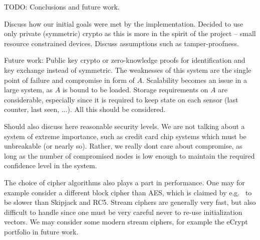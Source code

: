 TODO: Conclusions and future work.

Discuss how our initial goals were met by the implementation. Decided to use only private (symmetric) crypto as this is more in the spirit of the project -- small resource constrained devices. Discuss assumptions such as tamper-proofness.

Future work: Public key crypto or zero-knowledge proofs for identification and key exchange instead of symmetric. The weaknesses of this system are the single point of failure and compromise in form of $A$. Scalability becomes an issue in a large system, as $A$ is bound to be loaded. Storage requirements on $A$ are considerable, especially since it is required to keep state on each sensor (last counter, last seen, ...). All this should be considered.

Should also discuss here reasonable security levels. We are not talking about a system of extreme importance, such as credit card chip systems which must be unbreakable (or nearly so). Rather, we really dont care about compromise, as long as the number of compromised nodes is low enough to maintain the required confidence level in the system.

The choice of cipher algorithms also plays a part in performance. One may for example consider a different block cipher than AES, which is claimed by e.g.\  to be slower than Skipjack and RC5. Stream ciphers are generally very fast, but also difficult to handle since one must be very careful never to re-use initialization vectors. We may consider some modern stream ciphers, for example the eCrypt portfolio in future work.